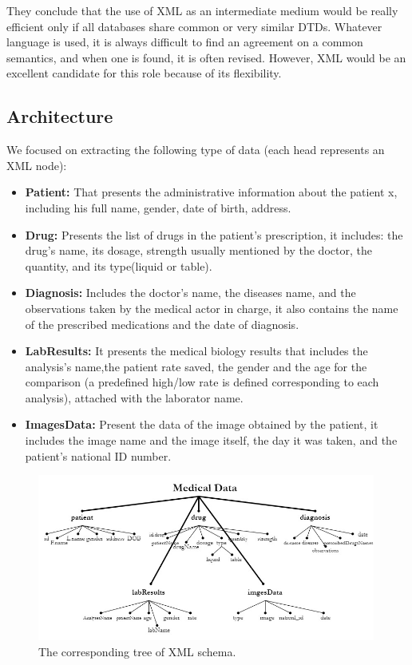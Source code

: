 
\bigbreak
They conclude that the use of XML as an intermediate medium would be really efficient only if all databases share common or very similar DTDs. Whatever language is used, it is always difficult to find an agreement on a common semantics, and when one is found, it is often revised. However, XML would be an excellent candidate for this role because of its flexibility.



\subsection{Architecture}



We focused on extracting the following type of data (each head represents an XML node):
\begin{itemize}
\item \textbf{Patient:} That presents the administrative information about the patient x, including his full name, gender, date of birth, address. 
\item \textbf{Drug:} Presents the list of drugs in the patient’s  prescription, it includes: the drug’s name, its dosage, strength usually mentioned by the doctor, the quantity, and its type(liquid or table).
\item \textbf{Diagnosis:} Includes the doctor's name, the diseases name, and the observations taken by the medical actor in charge, it also contains the name of the prescribed medications and the date of diagnosis. 
\item \textbf{LabResults:} It presents the medical biology results that includes the analysis’s name,the patient rate saved, the gender and the age for the comparison (a predefined high/low rate is defined corresponding to each analysis), attached with the laborator name.
\item \textbf{ImagesData:} Present the data of the image obtained by the patient, it includes the image name and the image itself, the day it was taken, and the patient's national ID number.
\end{itemize}
\begin{figure}[h!]
  \center
  \includegraphics[width=0.99\textwidth]{images/chapter3/tree.jpg}
  \caption{The corresponding tree of XML schema.}
  \label{fig:xmlschema}
\end{figure}
\newpage
